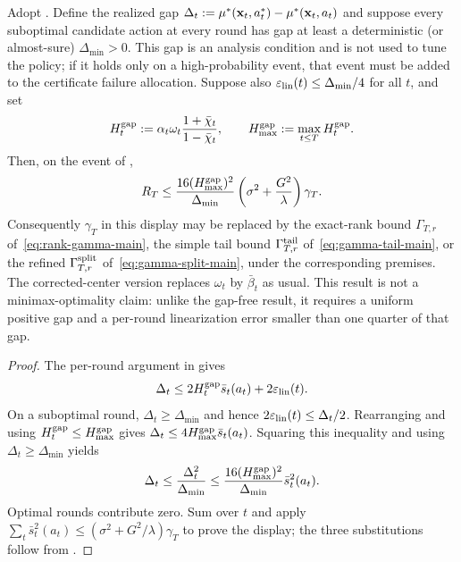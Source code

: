 \begin{corollary}
\label{cor:gap-dependent-exact-current}
Adopt .  Define the realized gap
$\Delta_t:=\mu^*(\mathbf{x}_t,a_t^*)-\mu^*(\mathbf{x}_t,a_t)$ and suppose every
suboptimal candidate action at every round has gap at least a deterministic
(or almost-sure) $\Delta_{\min}>0$.  This gap is an analysis condition and is
not used to tune the policy; if it holds only on a high-probability event, that
event must be added to the certificate failure allocation.  Suppose also
$\varepsilon_{\mathrm{lin}}(t)\le\Delta_{\min}/4$ for all $t$, and set
\[
 H_t^{\rm gap}:=\alpha_t\omega_t
 \frac{1+\bar\chi_t}{1-\bar\chi_t},\qquad
 H_{\max}^{\rm gap}:=\max_{t\le T}H_t^{\rm gap}.
\]
Then, on the event of ,
\begin{equation}\label{eq:gap-dependent-exact-current}
 R_T\le\frac{16(H_{\max}^{\rm gap})^2}{\Delta_{\min}}
 \left(\sigma^2+\frac{G^2}{\lambda}\right)\gamma_T.
\end{equation}
Consequently $\gamma_T$ in this display may be replaced by the exact-rank
bound $\Gamma_{T,r}$ of~\eqref{eq:rank-gamma-main}, the simple tail bound
$\Gamma^{\rm tail}_{T,r}$ of~\eqref{eq:gamma-tail-main}, or the refined
$\Gamma^{\rm split}_{T,r}$ of~\eqref{eq:gamma-split-main}, under the
corresponding premises.  The corrected-center version replaces $\omega_t$ by
$\bar\beta_t$ as usual.  This result is not a minimax-optimality claim: unlike
the gap-free result, it requires a uniform positive gap and a per-round
linearization error smaller than one quarter of that gap.
\end{corollary}
\begin{proof}
The per-round argument in
 gives
\[
 \Delta_t\le2H_t^{\rm gap}\bar s_t(a_t)+2\varepsilon_{\mathrm{lin}}(t).
\]
On a suboptimal round, $\Delta_t\ge\Delta_{\min}$ and hence
$2\varepsilon_{\mathrm{lin}}(t)\le\Delta_t/2$.  Rearranging and using
$H_t^{\rm gap}\le H_{\max}^{\rm gap}$ gives
$\Delta_t\le4H_{\max}^{\rm gap}\bar s_t(a_t)$.  Squaring this inequality and using
$\Delta_t\ge\Delta_{\min}$ yields
\[
 \Delta_t\le\frac{\Delta_t^2}{\Delta_{\min}}
 \le\frac{16(H_{\max}^{\rm gap})^2}{\Delta_{\min}}\bar s_t^2(a_t).
\]
Optimal rounds contribute zero.  Sum over $t$ and apply
$\sum_t\bar s_t^2(a_t)\le
(\sigma^2+G^2/\lambda)\gamma_T$ to prove the display; the three substitutions
follow from .
\end{proof}
